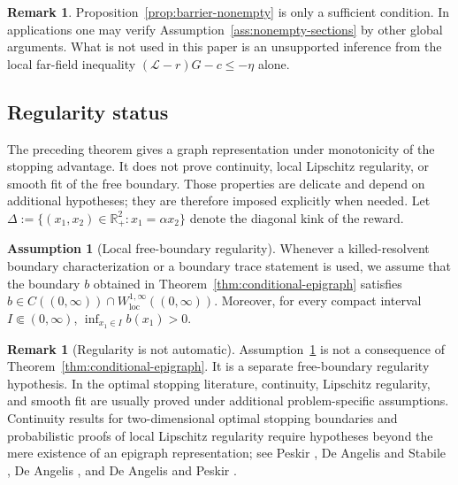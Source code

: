 \documentclass[pdflatex,sn-mathphys-num]{sn-jnl}
\theoremstyle{plain}
\theoremstyle{definition}
\newtheorem{assumption}[theorem]{Assumption}
\newtheorem{remark}[theorem]{Remark}
\newcommand{\R}{\mathbb{R}}
\begin{document}
\begin{remark}
\label{rem:nonemptiness-warning}
Proposition~\ref{prop:barrier-nonempty} is only a sufficient condition. In
applications one may verify Assumption~\ref{ass:nonempty-sections} by other
global arguments. What is not used in this paper is an unsupported inference
from the local far-field inequality $(\mathcal L-r)G-c\le-\eta$ alone.
\end{remark}

\subsection{Regularity status}
\label{sec:regularity-status}
The preceding theorem gives a graph representation under monotonicity of the
stopping advantage. It does not prove continuity, local Lipschitz regularity,
or smooth fit of the free boundary. Those properties are delicate and depend
on additional hypotheses; they are therefore imposed explicitly when needed.
Let
$   \Delta:=\{(x_1,x_2)\in\R^2_+:x_1=\alpha x_2\}$
denote the diagonal kink of the reward.

\begin{assumption}[Local free-boundary regularity]
\label{ass:free-boundary-regularity}
Whenever a killed-resolvent boundary characterization or a boundary trace
statement is used, we assume that the boundary $b$ obtained in
Theorem~\ref{thm:conditional-epigraph} satisfies
$   b\in C((0,\infty))\cap W^{1,\infty}_{\mathrm{loc}}((0,\infty))$.
Moreover, for every compact interval $I\Subset(0,\infty)$,
$\inf_{x_1\in I}b(x_1)>0$.
\end{assumption}

\begin{remark}[Regularity is not automatic]
\label{rem:regularity-not-automatic}
Assumption~\ref{ass:free-boundary-regularity} is not a consequence of
Theorem~\ref{thm:conditional-epigraph}. It is a separate free-boundary
regularity hypothesis. In the optimal stopping literature, continuity,
Lipschitz regularity, and smooth fit are usually proved under additional
problem-specific assumptions. Continuity results for two-dimensional optimal
stopping boundaries and probabilistic proofs of local Lipschitz regularity
require hypotheses beyond the mere existence of an epigraph representation; see
Peskir \cite{peskir2019continuity}, De Angelis and Stabile \cite{de2019lipschitz},
De Angelis \cite{de2015note}, and De Angelis and Peskir
\cite{de2020global}.
\end{remark}
\end{document}
